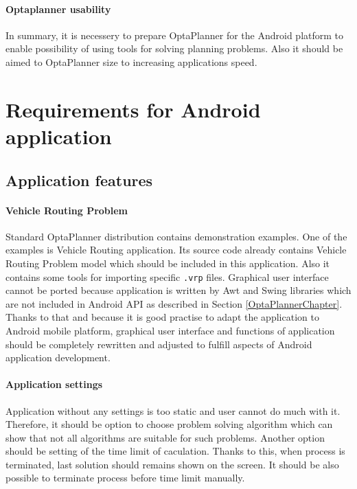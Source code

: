 \paragraph{Optaplanner usability}
In summary, it is necessery to prepare OptaPlanner for the Android platform to enable possibility of using tools for
solving planning problems. Also it should be aimed to OptaPlanner size to increasing applications speed.

\section{Requirements for Android application}

\subsection{Application features}\label{FeaturesSection}

\paragraph{Vehicle Routing Problem}
Standard OptaPlanner distribution \cite{OptaPlannerDistribution} contains demonstration examples. One of the examples is
Vehicle Routing application. Its source code already contains Vehicle Routing Problem model which should be included in
this application. Also it contains some tools for importing specific \texttt{.vrp} files. Graphical user interface
cannot be ported because application is written by Awt and Swing libraries which are not included in Android API as
described in Section \ref{OptaPlannerChapter}. Thanks to that and because it is good practise to adapt the application
to Android mobile platform, graphical user interface and functions of application should be completely rewritten and
adjusted to fulfill aspects of Android application development.

\paragraph{Application settings}
Application without any settings is too static and user cannot do much with it. Therefore, it should be option to choose
problem solving algorithm which can show that not all algorithms are suitable for such problems. Another option should
be setting of the time limit of caculation. Thanks to this, when process is terminated, last solution should remains
shown on the screen. It should be also possible to terminate process before time limit manually.

